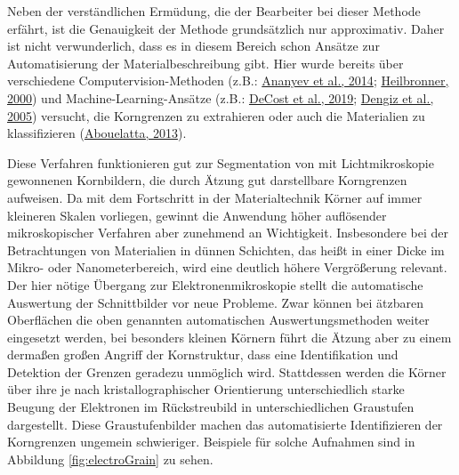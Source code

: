 \documentclass[
  12pt,
  openany]{book}
\begin{document}
Neben der verständlichen Ermüdung, die der Bearbeiter bei dieser Methode erfährt, ist die Genauigkeit der Methode grundsätzlich nur approximativ. Daher ist nicht verwunderlich, dass es in diesem Bereich schon Ansätze zur Automatisierung der Materialbeschreibung gibt.
Hier wurde bereits über verschiedene Computervision-Methoden (z.B.: \protect\hyperlink{ref-ananyevCuGdCodoped2014}{Ananyev et al., 2014}; \protect\hyperlink{ref-heilbronnerAutomaticGrainBoundary2000}{Heilbronner, 2000}) und Machine-Learning-Ansätze (z.B.: \protect\hyperlink{ref-decostHighThroughputQuantitative2019}{DeCost et al., 2019}; \protect\hyperlink{ref-dengizGrainBoundaryDetection2005}{Dengiz et al., 2005}) versucht, die Korngrenzen zu extrahieren oder auch die Materialien zu klassifizieren (\protect\hyperlink{ref-abouelattaClassificationCopperAlloys2013}{Abouelatta, 2013}).

Diese Verfahren funktionieren gut zur Segmentation von mit Lichtmikroskopie gewonnenen Kornbildern, die durch Ätzung gut darstellbare Korngrenzen aufweisen.
Da mit dem Fortschritt in der Materialtechnik Körner auf immer kleineren Skalen vorliegen, gewinnt die Anwendung höher auflösender mikroskopischer Verfahren aber zunehmend an Wichtigkeit. Insbesondere bei der Betrachtungen von Materialien in dünnen Schichten, das heißt in einer Dicke im Mikro- oder Nanometerbereich, wird eine deutlich höhere Vergrößerung relevant. Der hier nötige Übergang zur Elektronenmikroskopie stellt die automatische Auswertung der Schnittbilder vor neue Probleme. Zwar können bei ätzbaren Oberflächen die oben genannten automatischen Auswertungsmethoden weiter eingesetzt werden, bei besonders kleinen Körnern führt die Ätzung aber zu einem dermaßen großen Angriff der Kornstruktur, dass eine Identifikation und Detektion der Grenzen geradezu unmöglich wird.
Stattdessen werden die Körner über ihre je nach kristallographischer Orientierung unterschiedlich starke Beugung der Elektronen im Rückstreubild in unterschiedlichen Graustufen dargestellt. Diese Graustufenbilder machen das automatisierte Identifizieren der Korngrenzen ungemein schwieriger. Beispiele für solche Aufnahmen sind in Abbildung \ref{fig:electroGrain} zu sehen.
\end{document}

